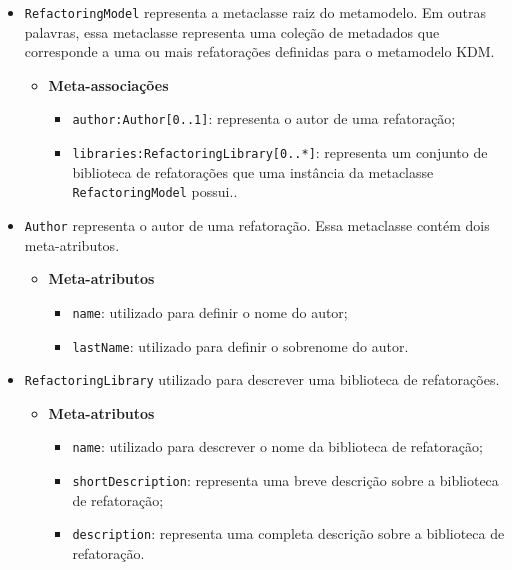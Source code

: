 \begin{itemize}
\item \texttt{RefactoringModel} representa a metaclasse raiz do metamodelo. Em outras palavras, essa metaclasse representa uma coleção de metadados que corresponde a uma ou mais refatorações definidas para o metamodelo KDM.

\begin{itemize}
	\item \textbf{Meta-associações}
		\begin{itemize}
			\item \texttt{author:Author[0..1]}: representa o autor de uma refatoração; 
			\item \texttt{libraries:RefactoringLibrary[0..*]}: representa um conjunto de biblioteca de refatorações que uma instância da metaclasse \texttt{RefactoringModel} possui..
		\end{itemize}
\end{itemize}

\item \texttt{Author} representa o autor de uma refatoração. Essa metaclasse contém dois meta-atributos.

\begin{itemize}
	\item \textbf{Meta-atributos}
		\begin{itemize}
			\item \texttt{name}: utilizado para definir o nome do autor;
			\item \texttt{lastName}: utilizado para definir o sobrenome do autor.
		\end{itemize}	
\end{itemize} 

\item \texttt{RefactoringLibrary} utilizado para descrever uma biblioteca de refatorações.

\begin{itemize}
	\item \textbf{Meta-atributos}
		\begin{itemize}
			\item \texttt{name}: utilizado para descrever o nome da biblioteca de refatoração;
			\item \texttt{shortDescription}: representa uma breve descrição sobre a biblioteca de refatoração;
			\item \texttt{description}: representa uma completa descrição sobre a biblioteca de refatoração.
		\end{itemize}	
\end{itemize} 


\end{itemize}
